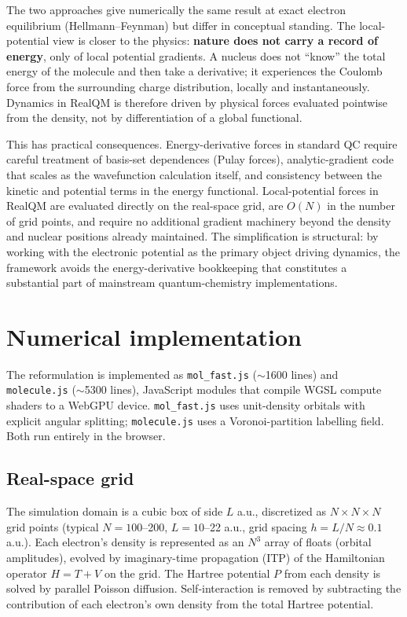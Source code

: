 \documentclass[11pt]{article}
\begin{document}
The two approaches give numerically the same result at exact electron equilibrium (Hellmann--Feynman) but differ in conceptual standing. The local-potential view is closer to the physics: \textbf{nature does not carry a record of energy}, only of local potential gradients. A nucleus does not ``know'' the total energy of the molecule and then take a derivative; it experiences the Coulomb force from the surrounding charge distribution, locally and instantaneously. Dynamics in RealQM is therefore driven by physical forces evaluated pointwise from the density, not by differentiation of a global functional.

This has practical consequences. Energy-derivative forces in standard QC require careful treatment of basis-set dependences (Pulay forces), analytic-gradient code that scales as the wavefunction calculation itself, and consistency between the kinetic and potential terms in the energy functional. Local-potential forces in RealQM are evaluated directly on the real-space grid, are $O(N)$ in the number of grid points, and require no additional gradient machinery beyond the density and nuclear positions already maintained. The simplification is structural: by working with the electronic potential as the primary object driving dynamics, the framework avoids the energy-derivative bookkeeping that constitutes a substantial part of mainstream quantum-chemistry implementations.

\section{Numerical implementation}\label{sec:implementation}

The reformulation is implemented as \texttt{mol\_fast.js} ($\sim$1600 lines) and \texttt{molecule.js} ($\sim$5300 lines), JavaScript modules that compile WGSL compute shaders to a WebGPU device. \texttt{mol\_fast.js} uses unit-density orbitals with explicit angular splitting; \texttt{molecule.js} uses a Voronoi-partition labelling field. Both run entirely in the browser.

\subsection{Real-space grid}

The simulation domain is a cubic box of side $L$ a.u., discretized as $N \times N \times N$ grid points (typical $N = 100$--200, $L = 10$--22 a.u., grid spacing $h = L/N \approx 0.1$ a.u.). Each electron's density is represented as an $N^3$ array of floats (orbital amplitudes), evolved by imaginary-time propagation (ITP) of the Hamiltonian operator $H = T + V$ on the grid. The Hartree potential $P$ from each density is solved by parallel Poisson diffusion. Self-interaction is removed by subtracting the contribution of each electron's own density from the total Hartree potential.
\end{document}
